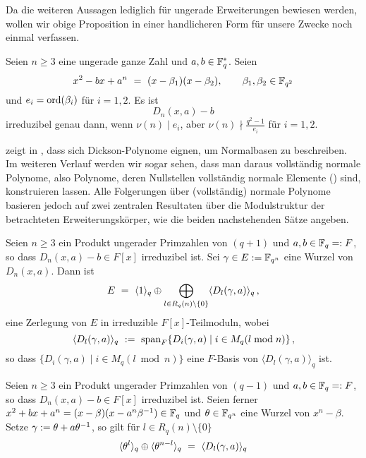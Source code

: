 Da die weiteren Aussagen lediglich für ungerade Erweiterungen bewiesen werden,
wollen wir obige Proposition in einer handlicheren Form für unsere Zwecke 
noch einmal verfassen.

\begin{kor}
  \label{kor:dickson_irred}
  Seien $n\geq 3$ eine ungerade ganze Zahl und $a,b\in \mathbb{F}_q^\ast$. Seien
  \[ x^2 - bx +a^n \ =\  (x-\beta_1)(x-\beta_2), \qquad 
    \beta_1,\beta_2 \in \mathbb{F}_{q^2}\]
  und $e_i = \operatorname{ord}(\beta_i)$ für $i=1,2$. Es ist
  \[ D_n(x,a) - b \]
  irreduzibel genau dann, wenn $\nu(n)\mid e_i$, aber 
  $\nu(n)\nmid \tfrac{q^2-1}{e_i}$ für $i=1,2$.
\end{kor}


\citeauthor{scheerhorn:1996} zeigt in
\autocites{scheerhorn:1996}{scheerhorn:1997}, dass sich Dickson-Polynome
eignen, um Normalbasen zu beschreiben. Im weiteren Verlauf werden wir sogar
sehen, dass man daraus vollständig normale Polynome, also Polynome, deren
Nullstellen vollständig normale Elemente () sind,
konstruieren lassen. Alle Folgerungen über (vollständig) normale Polynome
basieren jedoch auf zwei zentralen Resultaten über die Modulstruktur der
betrachteten Erweiterungskörper, wie die beiden nachstehenden Sätze angeben.

\begin{satz}
  \label{satz:scheerhorn1}
  Seien $n\geq 3$ ein Produkt ungerader Primzahlen von $(q+1)$ und 
  $a,b\in \mathbb{F}_q =: F$, so dass $D_n(x,a)-b \in F[x]$ irreduzibel ist.
  Sei $\gamma \in E := \mathbb{F}_{q^n}$ eine Wurzel von $D_n(x,a)$. Dann ist
  \[ E \ =\  \langle 1\rangle_q \oplus 
    \bigoplus_{l\in R_q(n)\setminus \{0\}} \langle D_l(\gamma,a)\rangle_q\,,\]
  eine Zerlegung von $E$ in irreduzible $F[x]$-Teilmoduln, wobei
  \[ \langle D_l(\gamma,a)\rangle_q \ :=\ 
    \operatorname{span}_F\{ D_i(\gamma,a) \mid i\in M_q(l\bmod n)\} \,,\]
  so dass $\{ D_i(\gamma,a) \mid i\in M_q(l\bmod n)\}$ eine $F$-Basis von
  $\langle D_l(\gamma,a)\rangle_q$ ist.
\end{satz}

\begin{satz} 
  \label{satz:scheerhorn2}
  Seien $n\geq 3$ ein Produkt ungerader Primzahlen von $(q-1)$ und
  $a,b \in \mathbb{F}_q =: F$, so dass $D_n(x,a)-b\in F[x]$ irreduzibel ist.
  Seien ferner $x^2+bx +a^n = (x-\beta)(x-a^n\beta^{-1}) \in \mathbb{F}_q$ und
  $\theta \in \mathbb{F}_{q^n}$ eine Wurzel von $x^n-\beta$. Setze 
  $\gamma := \theta + a\theta^{-1}$, so gilt für 
  $l\in R_q(n) \setminus\{0\}$
  \[ \langle \theta^l\rangle_q \oplus \langle \theta^{n-l}\rangle_q
  \ =\  \langle D_l(\gamma,a)\rangle_q\]
\end{satz}

